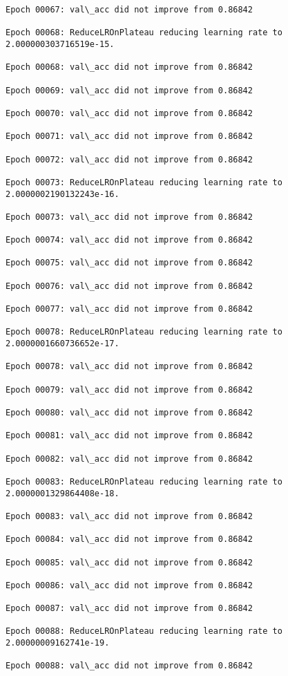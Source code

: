 \documentclass[11pt]{article}
\begin{document}
\begin{Verbatim}[commandchars=\\\{\}]
Epoch 00067: val\_acc did not improve from 0.86842

Epoch 00068: ReduceLROnPlateau reducing learning rate to 2.000000303716519e-15.

Epoch 00068: val\_acc did not improve from 0.86842

Epoch 00069: val\_acc did not improve from 0.86842

Epoch 00070: val\_acc did not improve from 0.86842

Epoch 00071: val\_acc did not improve from 0.86842

Epoch 00072: val\_acc did not improve from 0.86842

Epoch 00073: ReduceLROnPlateau reducing learning rate to 2.0000002190132243e-16.

Epoch 00073: val\_acc did not improve from 0.86842

Epoch 00074: val\_acc did not improve from 0.86842

Epoch 00075: val\_acc did not improve from 0.86842

Epoch 00076: val\_acc did not improve from 0.86842

Epoch 00077: val\_acc did not improve from 0.86842

Epoch 00078: ReduceLROnPlateau reducing learning rate to 2.0000001660736652e-17.

Epoch 00078: val\_acc did not improve from 0.86842

Epoch 00079: val\_acc did not improve from 0.86842

Epoch 00080: val\_acc did not improve from 0.86842

Epoch 00081: val\_acc did not improve from 0.86842

Epoch 00082: val\_acc did not improve from 0.86842

Epoch 00083: ReduceLROnPlateau reducing learning rate to 2.0000001329864408e-18.

Epoch 00083: val\_acc did not improve from 0.86842

Epoch 00084: val\_acc did not improve from 0.86842

Epoch 00085: val\_acc did not improve from 0.86842

Epoch 00086: val\_acc did not improve from 0.86842

Epoch 00087: val\_acc did not improve from 0.86842

Epoch 00088: ReduceLROnPlateau reducing learning rate to 2.00000009162741e-19.

Epoch 00088: val\_acc did not improve from 0.86842


\end{Verbatim}
\end{document}
